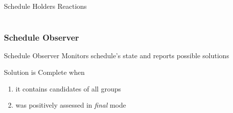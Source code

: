 \begin{frame}{Schedule Holders Reactions}
  \centering
  \\[-5pt]
  \\[-5pt]
\end{frame}

\subsubsection{Schedule Observer}

\begin{frame}{Schedule Observer}
  Monitors schedule's state and reports possible solutions
  \bigskip
  \begin{block}{Solution is Complete}
    when
    \begin{enumerate}
      \item it contains candidates of all groups
      \item was positively assessed in \emph{final} mode
    \end{enumerate}
  \end{block}
  \bigskip
  \centering
\end{frame}
